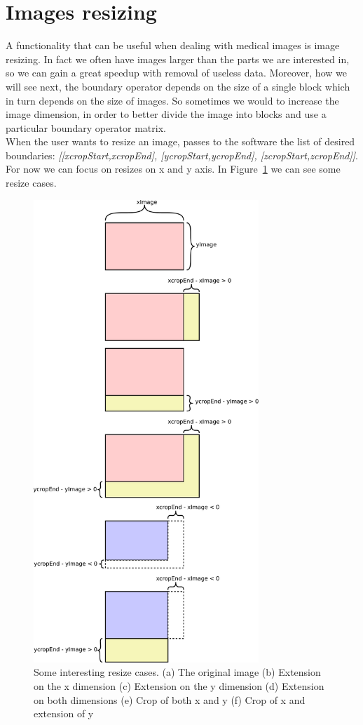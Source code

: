 \section{Images resizing}\label{sec32:ImagesResizing}

A functionality that can be useful when dealing with medical images is image resizing. In fact we often have images larger than the parts we are interested in, so we can gain a great speedup with removal of useless data. Moreover, how we will see next, the boundary operator depends on the size of a single block which in turn depends on the size of images. So sometimes we would to increase the image dimension, in order to better divide the image into blocks and use a particular boundary operator matrix.\\

When the user wants to resize an image, passes to the software the list of desired boundaries: \textit{[[xcropStart,xcropEnd], [ycropStart,ycropEnd], [zcropStart,zcropEnd]]}. For now we can focus on resizes on x and y axis. In Figure~\ref{fig:resizeCases} we can see some resize cases.

\begin{figure}[htbp] %
   \centering
   \includegraphics[width=8.5cm]{images/resizeCases.pdf} \hfill
   \caption[Some interesting resize cases]{Some interesting resize cases. (a) The original image (b) Extension on the x dimension (c) Extension on the y dimension (d) Extension on both dimensions (e) Crop of both x and y (f) Crop of x and extension of y}
   \label{fig:resizeCases}
\end{figure}

